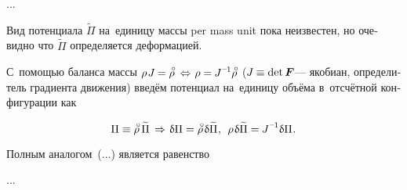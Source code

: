 ...

\begin{otherlanguage}{russian}

Вид потенциала ${\widetilde{\Pi}}$ на~единицу \hbox{массы} per mass unit пока неизвестен, но очевидно что ${\widetilde{\Pi}}$ определяется деформацией.

С~помощью баланса массы ${\rho \hspace{.2ex} J \hspace{-0.1ex} = \mathcircabove{\rho} \hspace{.5ex} \Leftrightarrow \hspace{.2ex} \rho = \hspace{-0.1ex} J^{\expminusone} \mathcircabove{\rho}}$ (${J \hspace{-0.1ex} \equiv \operatorname{det} \bm{F}\hspace{-0.12ex}}$\:--- якобиан, определитель градиента движения) введём потенциал на~единицу объёма в~отсчётной конфигурации как

\nopagebreak\begin{equation}
\Pi \equiv \mathcircabove{\rho} \hspace{.4ex} \widetilde{\Pi}
\hspace{.4ex} \Rightarrow \hspace{.2ex}
\variation{\Pi} = \mathcircabove{\rho} \hspace{.25ex} \variation{\widetilde{\Pi}}
\hspace{.1ex}, \:\:
\rho \hspace{.2ex} \variation{\widetilde{\Pi}} = \hspace{-0.1ex} J^{\expminusone} \variation{\Pi} \hspace{.1ex}.
\end{equation}

Полным аналогом~(...) является равенство

...



\end{otherlanguage}



